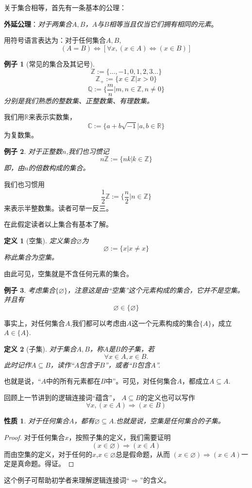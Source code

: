 \documentclass[a4paper, 11pt]{article} %
\newcommand*{\vs}{\vspace{5pt}}
\newtheorem{prop}{性质}[subsection]
\newtheorem{definition}{定义}[subsection]
\newtheorem{example}{例子}[subsection]
\begin{document}
关于集合相等，首先有一条基本的公理：\vs

\textbf{外延公理}：\emph{对于两集合$A,B$，$A$与$B$相等当且仅当它们拥有相同的元素}。

用符号语言表达为：对于任何集合$A,B$,
$$(A=B)\Leftrightarrow[\forall x,(x\in A)\Leftrightarrow(x\in B)]$$

\begin{example}[常见的集合及其记号]
$$\mathbb{Z}:=\{...,-1,0,1,2,3...\}$$
$$\mathbb{Z_+}:=\{x\in\mathbb{Z}|x>0\}$$
$$\mathbb{Q}:=\{\frac{m}{n}|m,n\in\mathbb{Z},n\neq0\}$$
分别是我们熟悉的整数集、正整数集、有理数集。
\end{example}
我们用$\mathbb{R}$来表示实数集，
$$\mathbb{C}:=\{a+b\sqrt{-1}|a,b\in\mathbb{R}\}$$
为复数集。

\begin{example}对于正整数$n$,我们也习惯记
$$n\mathbb{Z}:=\{nk|k\in\mathbb{Z}\}$$
即，由$n$的倍数构成的集合。
\end{example}

我们也习惯用
$$\frac{1}{2}\mathbb{Z}:=\{\frac{n}{2}|n\in\mathbb{Z}\}$$
来表示半整数集。读者可举一反三。

在此假定读者以上集合有基本了解。

\begin{definition}[空集]
定义集合$\varnothing$为
$$\varnothing:=\{x|x\neq x\}$$
称此集合为空集。
\end{definition}
由此可见，空集就是不含任何元素的集合。

\begin{example}
考虑集合$\{\varnothing\}$，注意这是由“空集”这个元素构成的集合，它并不是空集。并且有
$$\varnothing\in\{\varnothing\}$$
\end{example}

事实上，对任何集合$A$,我们都可以考虑由$A$这一个元素构成的集合$\{A\}$，成立$A\in\{A\}$.

\begin{definition}[子集]
对于集合$A,B$，称$A$是$B$的子集，若
$$\forall x\in A, x\in B.$$
此时记作$A\subseteq B$，读作“$A$包含于$B$”，或者“$B$包含$A$”.
\end{definition}
也就是说，“$A$中的所有元素都在$B$中”。可见，对任何集合$A$，都成立$A\subseteq A$.

回顾上一节讲到的逻辑连接词“蕴含”，
$A\subseteq B$的定义也可以写作
$$\forall x, (x\in A)\Rightarrow(x\in B)$$

\begin{prop}
对于任何集合$A$，都有$\varnothing\subseteq A$.也就是说，空集是任何集合的子集。
\end{prop}
\begin{proof}
对于任何集合$x$，按照子集的定义，我们需要证明
$$(x\in\varnothing)\Rightarrow(x\in A)$$
而由空集的定义，对于任何的$x$,$x\in\varnothing$总是假命题，从而
$(x\in\varnothing)\Rightarrow(x\in A)$一定是真命题。得证。
\end{proof}
这个例子可帮助初学者来理解逻辑连接词“$\Rightarrow$”的含义。
\end{document}
